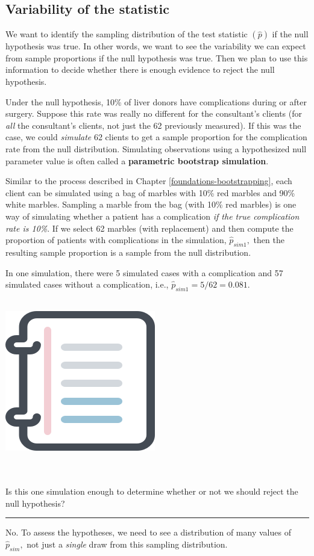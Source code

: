 \documentclass[
  10pt,
  openany]{book}
\newenvironment{mdframedwithfootGPWE}
{   
    \savenotes
    \begin{mdframed}[%
    topline=true, bottomline=true, linecolor=oiB, linewidth=0.5pt,
    rightline=false, leftline=false,
    backgroundcolor=oiLGray]
    \renewcommand{\thempfootnote}{\arabic{footnote}}
    }
{
    \end{mdframed}
    \spewnotes
}
\newenvironment{workedexample}{
    \let\oldrule\rule
    \renewcommand{\rule}[2]{\vspace{-2mm}\oldrule{##1}{##2}\vspace{-2mm}}
\vspace{4mm}
\begin{mdframedwithfootGPWE}
\begin{minipage}[t]{0.10\textwidth}
{$\:$ \\ \setkeys{Gin}{width=2.5em,keepaspectratio}\includegraphics{images/_icons/worked-example.png}}
\end{minipage}
\hfill
\begin{minipage}[t]{0.90\textwidth}
\vspace{-2mm}
\setlength{\parskip}{1em}
\noindent\textbf{\color{oiB}\small\fontfamily{phv}\selectfont{\MakeUppercase{Example}}} $\:$ \\ \\
}{\end{minipage}
\end{mdframedwithfootGPWE}
\vspace{4mm}
}
\begin{document}
\clearpage

\hypertarget{variability-of-the-statistic-7}{%
\subsection{Variability of the statistic}\label{variability-of-the-statistic-7}}

We want to identify the sampling distribution of the test statistic \((\hat{p})\) if the null hypothesis was true.
In other words, we want to see the variability we can expect from sample proportions if the null hypothesis was true.
Then we plan to use this information to decide whether there is enough evidence to reject the null hypothesis.

Under the null hypothesis, 10\% of liver donors have complications during or after surgery.
Suppose this rate was really no different for the consultant's clients (for \emph{all} the consultant's clients, not just the 62 previously measured).
If this was the case, we could \emph{simulate} 62 clients to get a sample proportion for the complication rate from the null distribution.
Simulating observations using a hypothesized null parameter value is often called a \textbf{parametric bootstrap simulation}.

Similar to the process described in Chapter \ref{foundations-bootstrapping}, each client can be simulated using a bag of marbles with 10\% red marbles and 90\% white marbles.
Sampling a marble from the bag (with 10\% red marbles) is one way of simulating whether a patient has a complication \emph{if the true complication rate is 10\%}.
If we select 62 marbles (with replacement) and then compute the proportion of patients with complications in the simulation, \(\hat{p}_{sim1},\) then the resulting sample proportion is a sample from the null distribution.

In one simulation, there were 5 simulated cases with a complication and 57 simulated cases without a complication, i.e., \(\hat{p}_{sim1} = 5/62 = 0.081.\)

\begin{workedexample}
Is this one simulation enough to determine whether or not we should reject the null hypothesis?

\begin{center}\rule{0.5\linewidth}{0.5pt}\end{center}

No.
To assess the hypotheses, we need to see a distribution of many values of \(\hat{p}_{sim},\) not just a \emph{single} draw from this sampling distribution.

\end{workedexample}
\end{document}
